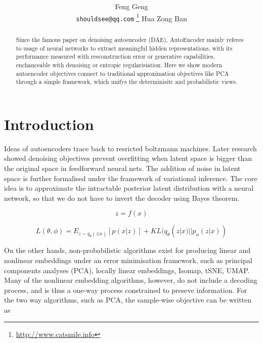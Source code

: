 \documentclass{article}
\title{
\mytitle
}
\author{ 
 \hspace{1mm} Feng Geng \\
 \texttt{shouldsee@qq.com} 
 \thanks{
	\href{http://www.catsmile.info}{http://www.catsmile.info}
     }
	\And
	Hua Zong Ban
}
\begin{document}
\maketitle

\begin{abstract}
	Since the famous paper on denoising autoencoder (DAE), 
	AutoEncoder mainly referes to usage
	of neural networks to extract meaningful hidden 
	representations, with its performance measured with 
	resconstruction error or generative capabilities,
	enchanceable with denoising or entropic
    regularisiation. Here we show modern autoencoder 
	objectives connect to traditional approximation
	objectives like PCA through a simple framework,
	which unifys the determinisitc and probabilistic views.
\end{abstract}



\section{Introduction}
	Ideas of autoencoders trace back to resricted boltzmann machines. 
	Later research showed denoising objectives prevent overfitting when 
	latent space is bigger than the original space in 
	feedforward neural nets. The addition of noise in latent 
	space is further formalised under the framework of variational
	inference. The core idea is to approximate the intractable
	posterior latent distribution with a neural network, 
	so that we do not have to invert the decoder using Bayes theorem.

	
	\begin{equation} \label{eq1}
	z = f(x)  
    \end{equation}
  	
    \begin{equation} \label{eq2}
	L(\theta,\phi) = E_{z\sim q_{\theta}(z|x)}[p(x|z)] +  KL( q_{\theta}(z|x) || p_\phi(z|x) )
	\end{equation}
	
	On the other hands, non-probabilistic algorithms 
	exist for producing linear and nonlinear embeddings
	under an error minimisation framework,
	such as principal components analyses (PCA), locally linear 
	embeddings, Isomap, tSNE, UMAP. Many of the nonlinear
	embedding algorithms, however, do not include a decoding process,
	and is thus a one-way process constrained to preseve information.
	For the two way algorithms, such as PCA, the sample-wise objective 
	can be written as 
\end{document}
